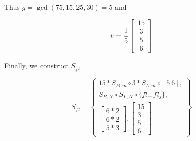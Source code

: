 Thus $g = \gcd(75,15,25,30) = 5$ and

\begin{displaymath}
v = {1 \over 5} \left[
\begin{array}{c}
15 \\
3 \\
5 \\
6
\end{array}\right]
\end{displaymath}

Finally, we construct $S_{fl}$

\begin{displaymath}
S_{fl} = \left\{
\begin{array}{c}
15 * S_{B, m} \circ 3 * S_{L, m} \circ [5\ 6], \\
S_{B, N} \circ S_{L, N} \circ \{fl_s, fl_j\}, \\
\left[
\begin{array}{c}
6 * 2 \\ 6 * 2 \\ 5 * 3
\end{array}
\right], \left[
\begin{array}{c}
15 \\ 3 \\ 5 \\ 6
\end{array}\right]
\end{array} \right\}
\end{displaymath}
